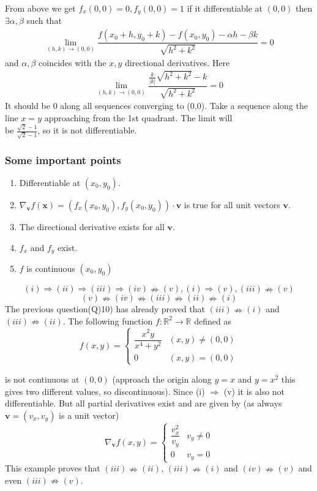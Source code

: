 \documentclass[11pt]{beamer}
\begin{document}
\begin{frame}
From above we get $f_x(0,0)=0,f_y(0,0)=1$ if it differentiable at $(0,0)$ then $\exists \alpha ,\beta$ such that
\begin{align*}
\underset{(h,k)\to(0,0)}{\lim} \dfrac{f(x_0+h,y_0+k)-f(x_0,y_0)-\alpha h-\beta k}{\sqrt{h^2+k^2}}=0
\end{align*}
and $\alpha,\beta$ coincides with the $x,y$ directional derivatives. Here
\begin{align*}
\underset{(h,k)\to(0,0)}{\lim} \dfrac{\frac{k}{|k|}\sqrt{h^2+k^2}-k}{\sqrt{h^2+k^2}}=0
\end{align*}
It should be 0 along all sequences converging to (0,0). Take a sequence along the line $x=y$ approaching from the 1st quadrant. The limit will \\be $\frac{\sqrt{2}-1}{\sqrt{2}-1}$, so it is not differentiable.
\end{frame}
\begin{frame}
\frametitle{Some important points}
\begin{enumerate}
  \item Differentiable at $(x_0,y_0)$.
  \item $\nabla_{\textbf{v}}f(\textbf{x})=(f_x(x_0,y_0),f_y(x_0,y_0))\cdot \textbf{v}$ is true for all unit vectors $\textbf{v}$.
  \item The directional derivative exists for all $\textbf{v}$.
  \item $f_x$ and $f_y$ exist.
  \item $f$ is continuous $(x_0,y_0)$
\end{enumerate}
$$(i)\Rightarrow (ii)\Rightarrow (iii)\Rightarrow (iv)\nRightarrow (v),(i)\Rightarrow (v),(iii)\nRightarrow (v)$$
$$(v)\nRightarrow (iv)\nRightarrow (iii)\nRightarrow (ii)\nRightarrow (i)$$
The previous question(Q)10) has already proved that $(iii)\nRightarrow (i)$ and $(iii)\nRightarrow (ii)$. The following function $f:\mathbb{R}^2\to\mathbb{R}$ defined as
\[f(x,y)= \begin{cases} 
      \dfrac{x^2y}{x^4+y^2} & (x,y)\neq (0,0) \\
      0 & (x,y)= (0,0)
   \end{cases}
\]
\end{frame}
\begin{frame}
is not continuous at $(0,0)$ (approach the origin along $y=x$ and $y=x^2$ this gives two different values, so discontinuous). Since (i) $\Rightarrow$ (v) it is also not differentiable. But all partial derivatives exist and are given by (as always $\textbf{v}=(v_x,v_y)$ is a unit vector)
$$\nabla_{\textbf{v}}f(x,y)= \begin{cases} 
      \dfrac{v_x^2}{v_y} & v_y\neq 0\\
      0 & v_y= 0
   \end{cases}$$
This example proves that $(iii)\nRightarrow (ii)$, $(iii)\nRightarrow (i)$ and $(iv)\nRightarrow (v)$ and even $(iii)\nRightarrow(v)$.
\end{frame}
\end{document}

